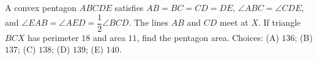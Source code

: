 A convex pentagon $ABCDE$ satisfies $AB=BC=CD=DE$, $\angle ABC=\angle CDE$, and $\angle EAB=\angle AED=\dfrac{1}{2}\angle BCD$. The lines $AB$ and $CD$ meet at $X$. If triangle $BCX$ has perimeter $18$ and area $11$, find the pentagon area. Choices: (A) $136$; (B) $137$; (C) $138$; (D) $139$; (E) $140$.
